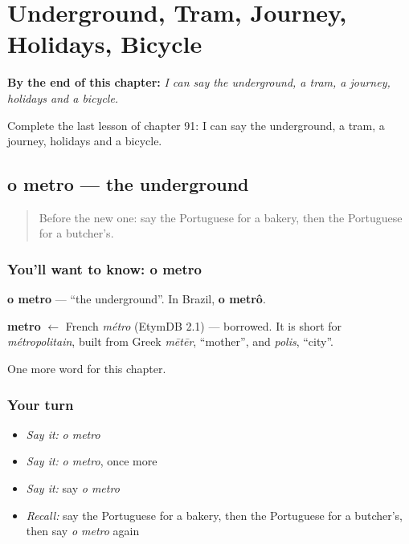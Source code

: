 
\chapter{Underground, Tram, Journey, Holidays, Bicycle}
\label{ch:pt-underground-tram-journey-holidays-bicycle}

\begin{chapteropening}
\textbf{By the end of this chapter:} \emph{I can say the underground, a tram, a journey, holidays and a bicycle.}

Complete the last lesson of chapter 91: I can say the underground, a tram, a journey, holidays and a bicycle.
\end{chapteropening}

\section[o metro]{o metro — the underground}

\label{lesson:PT-C91-metro}



\begin{quote}
Before the new one: say the Portuguese for a bakery, then the Portuguese for a butcher's.
\end{quote}

\subsection*{You'll want to know: o metro}
\textbf{o metro} — \textquotedblleft{}the underground\textquotedblright{}. In Brazil, \textbf{o metrô}.

\begin{cousinweb}
\textbf{metro} $\leftarrow$ French \emph{métro} (EtymDB 2.1) — borrowed. It is short for \emph{métropolitain}, built from Greek \emph{mētēr}, \textquotedblleft{}mother\textquotedblright{}, and \emph{polis}, \textquotedblleft{}city\textquotedblright{}.
\end{cousinweb}

\begin{grammarlens}[title={What you've built}]
One more word for this chapter.
\end{grammarlens}

\subsection*{Your turn}
\begin{itemize}
\raggedright
  \item \emph{Say it:} \emph{o metro}
  \item \emph{Say it:} \emph{o metro}, once more
  \item \emph{Say it:} say \emph{o metro}
  \item \emph{Recall:} say the Portuguese for a bakery, then the Portuguese for a butcher's, then say \emph{o metro} again
\end{itemize}

